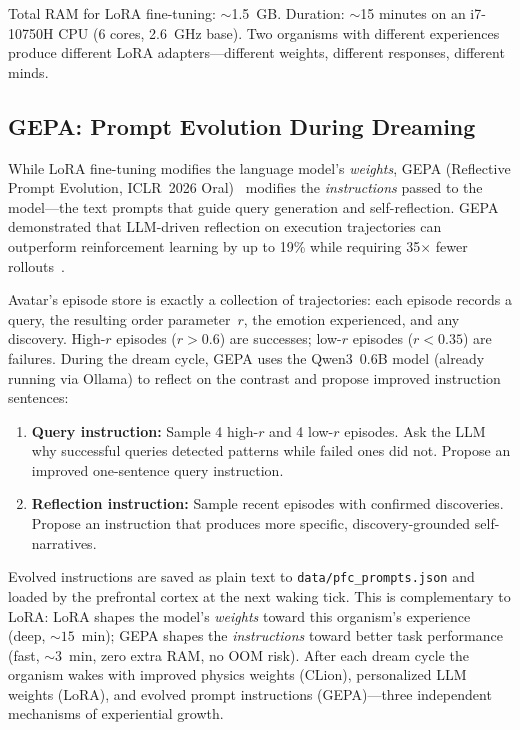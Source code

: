 \documentclass[11pt,a4paper,twocolumn]{article}
\begin{document}
Total RAM for LoRA fine-tuning: $\sim$1.5~GB.
Duration: $\sim$15 minutes on an i7-10750H CPU (6 cores, 2.6~GHz base).
Two organisms with different experiences produce different LoRA adapters---different weights, different responses, different minds.

\subsection{GEPA: Prompt Evolution During Dreaming}

While LoRA fine-tuning modifies the language model's \emph{weights}, GEPA (Reflective Prompt Evolution, ICLR~2026 Oral)~\cite{gepa2026} modifies the \emph{instructions} passed to the model---the text prompts that guide query generation and self-reflection.
GEPA demonstrated that LLM-driven reflection on execution trajectories can outperform reinforcement learning by up to 19\% while requiring 35$\times$ fewer rollouts~\cite{gepa2026}.

Avatar's episode store is exactly a collection of trajectories: each episode records a query, the resulting order parameter~$r$, the emotion experienced, and any discovery.
High-$r$ episodes ($r > 0.6$) are successes; low-$r$ episodes ($r < 0.35$) are failures.
During the dream cycle, GEPA uses the Qwen3~0.6B model (already running via Ollama) to reflect on the contrast and propose improved instruction sentences:
\begin{enumerate}
\item \textbf{Query instruction:} Sample 4 high-$r$ and 4 low-$r$ episodes. Ask the LLM why successful queries detected patterns while failed ones did not. Propose an improved one-sentence query instruction.
\item \textbf{Reflection instruction:} Sample recent episodes with confirmed discoveries. Propose an instruction that produces more specific, discovery-grounded self-narratives.
\end{enumerate}
Evolved instructions are saved as plain text to \texttt{data/pfc\_prompts.json} and loaded by the prefrontal cortex at the next waking tick.
This is complementary to LoRA: LoRA shapes the model's \emph{weights} toward this organism's experience (deep, ${\sim}15$~min); GEPA shapes the \emph{instructions} toward better task performance (fast, ${\sim}3$~min, zero extra RAM, no OOM risk).
After each dream cycle the organism wakes with improved physics weights (CLion), personalized LLM weights (LoRA), and evolved prompt instructions (GEPA)---three independent mechanisms of experiential growth.
\end{document}
